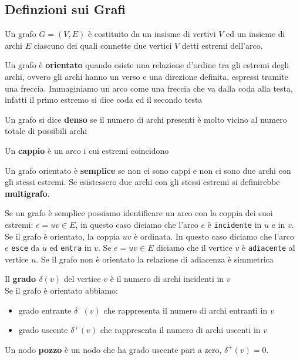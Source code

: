 \subsection{Definzioni sui Grafi}
\begin{definition}
    Un grafo \textbf{$G=(V,E)$} è costituito da un insisme di vertivi $V$ ed un insieme di archi $E$ ciascuno dei quali connette due vertici $V$ detti estremi dell'arco.\\
\end{definition}
\begin{definition}
Un grafo è \textbf{orientato} quando esiste una relazione d’ordine tra gli estremi degli
archi, ovvero gli archi hanno un verso e una direzione definita, espressi tramite una freccia.
Immaginiamo un arco come una freccia che va dalla coda alla testa, infatti il primo estremo si
dice coda ed il secondo testa\\
\end{definition}
\begin{definition}
    Un grafo si dice \textbf{denso} se il numero di archi presenti è molto vicino al numero totale di possibili archi\\
\end{definition}
\begin{definition}
    Un \textbf{cappio} è un arco i cui estremi coincidono\\
\end{definition}
\begin{definition}
Un grafo orientato è \textbf{semplice} se non ci sono cappi e non ci sono due archi con gli
stessi estremi. Se esistessero due archi con gli stessi estremi si definirebbe \textbf{multigrafo}.\\
\end{definition}
\begin{definition}
Se un grafo è semplice possiamo identificare un arco con la coppia dei suoi estremi:
$e= uv \in E$, in questo caso diciamo che l’arco $e$ è \texttt{incidente} in $u$ e in $v$.
Se il grafo è orientato, la coppia $uv$ è ordinata. In questo caso diciamo che l’arco $e$ \texttt{esce} da
$u$ ed \texttt{entra} in $v$.
Se $e = uv \in E$ diciamo che il vertice $v$ è \texttt{adiacente} al vertice $u$. Se il grafo non è orientato
la relazione di adiacenza è simmetrica\\
\end{definition}
\begin{definition}
    Il \textbf{grado $\delta(v)$} del vertice $v$ è il numero di archi incidenti in $v$\\
    Se il grafo è orientato abbiamo:
    \begin{itemize}
        \item grado entrante $\delta^-(v)$ che rappresenta il numero di archi entranti in $v$
        \item grado uscente $\delta^+(v)$ che rappresenta il numero di archi uscenti in $v$
    \end{itemize}
    \noindent Un nodo \textbf{pozzo} è un nodo che ha grado uscente pari a zero, $\delta^+(v)=0$.\\
\end{definition}

